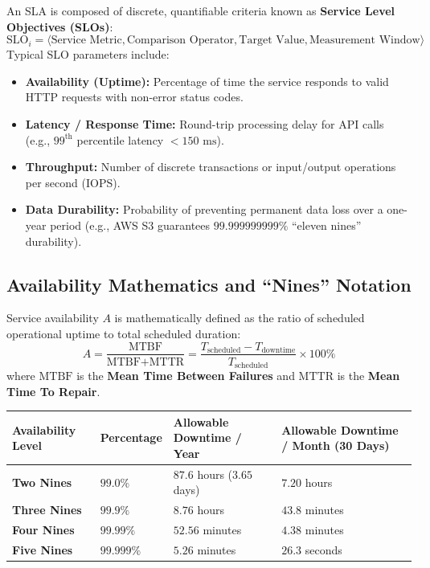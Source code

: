 An SLA is composed of discrete, quantifiable criteria known as \textbf{Service Level Objectives (SLOs)}:
\begin{equation}
\text{SLO}_i = \langle \text{Service Metric}, \text{Comparison Operator}, \text{Target Value}, \text{Measurement Window} \rangle
\end{equation}
Typical SLO parameters include:
\begin{itemize}[leftmargin=*]
  \item \textbf{Availability (Uptime):} Percentage of time the service responds to valid HTTP requests with non-error status codes.
  \item \textbf{Latency / Response Time:} Round-trip processing delay for API calls (e.g., $99^{\text{th}}$ percentile latency $< 150\text{ ms}$).
  \item \textbf{Throughput:} Number of discrete transactions or input/output operations per second (IOPS).
  \item \textbf{Data Durability:} Probability of preventing permanent data loss over a one-year period (e.g., AWS S3 guarantees $99.999999999\%$ ``eleven nines'' durability).
\end{itemize}

\subsection{Availability Mathematics and ``Nines'' Notation}
Service availability $A$ is mathematically defined as the ratio of scheduled operational uptime to total scheduled duration:
\begin{equation}
A = \frac{\text{MTBF}}{\text{MTBF} + \text{MTTR}} = \frac{T_{\text{scheduled}} - T_{\text{downtime}}}{T_{\text{scheduled}}} \times 100\%
\end{equation}
where $\text{MTBF}$ is the \textbf{Mean Time Between Failures} and $\text{MTTR}$ is the \textbf{Mean Time To Repair}.

\begin{center}
\begin{tabularx}{\textwidth}{>{\bfseries}l l X X}
\toprule
Availability Level & Percentage & Allowable Downtime / Year & Allowable Downtime / Month (30 Days)\\
\midrule
Two Nines & $99.0\%$ & $87.6$ hours ($3.65$ days) & $7.20$ hours\\
Three Nines & $99.9\%$ & $8.76$ hours & $43.8$ minutes\\
Four Nines & $99.99\%$ & $52.56$ minutes & $4.38$ minutes\\
Five Nines & $99.999\%$ & $5.26$ minutes & $26.3$ seconds\\
\bottomrule
\end{tabularx}
\end{center}

